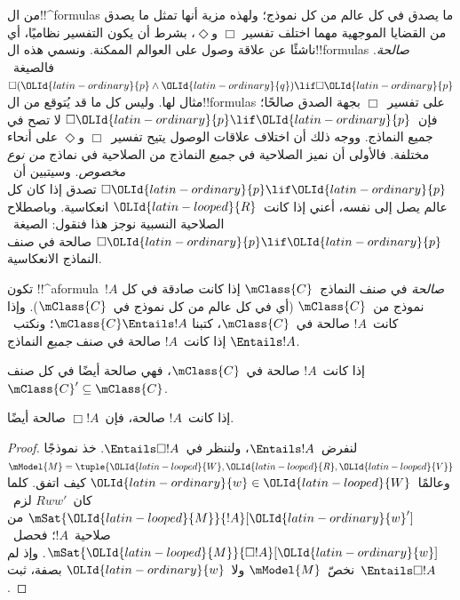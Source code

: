 \documentclass[../../../include/open-logic-section]{subfiles}
\begin{document}


\begin{explain}
  من ال!!^{formula}s ما يصدق في كل عالم من كل نموذج؛ ولهذه مزية
  أنها تمثل ما يصدق من القضايا الموجهية مهما اختلف تفسير
  $\Box$ و$\Diamond$، بشرط أن يكون التفسير نظاميًا، أي ناشئًا عن
  علاقة وصول على العوالم الممكنة. ونسمي هذه ال!!{formula}s
  \emph{صالحة}. فالصيغة~$\Box(\OLId{latin-ordinary}{p} \land \OLId{latin-ordinary}{q}) \lif \Box \OLId{latin-ordinary}{p}$ مثال لها.
  وليس كل ما قد يُتوقع من ال!!{formula}s على تفسير~$\Box$ بجهة
  الصدق صالحًا؛ فإن~$\Box \OLId{latin-ordinary}{p} \lif \OLId{latin-ordinary}{p}$ لا تصح في جميع النماذج.
  ووجه ذلك أن اختلاف علاقات الوصول يتيح تفسير~$\Box$ و$\Diamond$
  على أنحاء مختلفة. فالأولى أن نميز الصلاحية في \emph{جميع}
  النماذج من الصلاحية في نماذج \emph{من نوع مخصوص}.
  وسيتبين أن~$\Box \OLId{latin-ordinary}{p} \lif \OLId{latin-ordinary}{p}$ تصدق إذا كان كل عالم يصل إلى نفسه،
  أعني إذا كانت~$\OLId{latin-looped}{R}$ انعكاسية. وباصطلاح الصلاحية النسبية نوجز هذا
  فنقول: الصيغة~$\Box \OLId{latin-ordinary}{p} \lif \OLId{latin-ordinary}{p}$ صالحة في صنف النماذج الانعكاسية.
\end{explain}

\begin{defn}
  تكون !!^a{formula}~$!A$ \emph{صالحة} في صنف النماذج~$\mClass{C}$
  إذا كانت صادقة في كل نموذج من~$\mClass{C}$ (أي في كل عالم من كل
  نموذج في~$\mClass{C}$). وإذا كانت~$!A$ صالحة في~$\mClass{C}$، كتبنا
  $\mClass{C} \Entails !A$؛ ونكتب~$\Entails !A$ إذا كانت~$!A$ صالحة
  في صنف \emph{جميع} النماذج.
\end{defn}

\begin{prop}
  إذا كانت~$!A$ صالحة في~$\mClass{C}$، فهي صالحة أيضًا في كل صنف
  $\mClass{C}' \subseteq \mClass{C}$.
\end{prop}

\begin{prop}
  إذا كانت~$!A$ صالحة، فإن~$\Box!A$ صالحة أيضًا.
\end{prop}

\begin{proof}
  لنفرض~$\Entails !A$، ولننظر في~$\Entails \Box!A$. خذ نموذجًا
  $\mModel{M} = \tuple{\OLId{latin-looped}{W}, \OLId{latin-looped}{R}, \OLId{latin-looped}{V}}$ وعالمًا~$\OLId{latin-ordinary}{w} \in \OLId{latin-looped}{W}$ كيف اتفق.
  كلما كان~$Rww'$ لزم~$\mSat{\OLId{latin-looped}{M}}{!A}[\OLId{latin-ordinary}{w}']$ من صلاحية~$!A$؛
  فحصل~$\mSat{\OLId{latin-looped}{M}}{\Box!A}[\OLId{latin-ordinary}{w}]$. وإذ لم نخصّ~$\mModel{M}$ ولا~$\OLId{latin-ordinary}{w}$
  بصفة، ثبت~$\Entails \Box!A$.
\end{proof}
\end{document}
